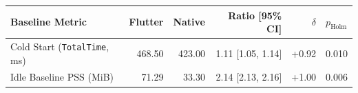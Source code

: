 \begin{tabular}{lrrrrl}
\toprule
Baseline Metric & Flutter & Native & Ratio [95\% CI] & $\delta$ & $p_{\mathrm{Holm}}$ \\
\midrule
Cold Start (\texttt{TotalTime}, ms) & 468.50 & 423.00 & 1.11 [1.05, 1.14] & +0.92 & 0.010 \\
Idle Baseline PSS (MiB) & 71.29 & 33.30 & 2.14 [2.13, 2.16] & +1.00 & 0.006 \\
\bottomrule
\end{tabular}
